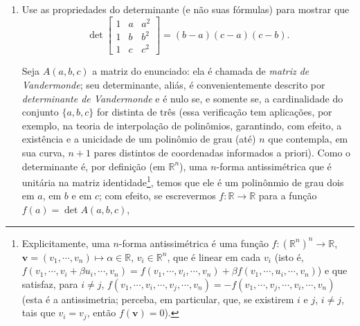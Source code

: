 \documentclass[leqno]{article}
\begin{document}
\begin{enumerate}
\begin{sol}
\end{sol}


\item Use as propriedades do determinante (e não suas fórmulas) para mostrar que
$$\det \begin{bmatrix} 1 & a & a^2 \\ 1 & b & b^2 \\ 1 & c & c^2 \end{bmatrix} = (b-a)(c-a)(c-b).$$

\begin{sol}	
	Seja $A(a, b, c)$ a matriz do enunciado: ela é chamada de \textit{matriz de Vandermonde}; seu determinante, aliás, é convenientemente descrito por \textit{determinante de Vandermonde} e é nulo se, e somente se, a cardinalidade do conjunto $\{a, b, c\}$ for distinta de três (essa verificação tem aplicações, por exemplo, na teoria de interpolação de polinômios, garantindo, com efeito, a existência e a unicidade de um polinômio de grau (até) $n$ que contempla, em sua curva, $n + 1$ pares distintos de coordenadas informados a priori). Como o determinante é, por definição (em $\mathbb{R}^{n}$), uma $n$-forma antissimétrica que é unitária na matriz identidade\footnote{Explicitamente, uma $n$-forma antissimétrica é uma função $f: (\mathbb{R}^{n})^{n} \rightarrow \mathbb{R}$, $\mathbf{v} = (v_{1}, \cdots, v_{n}) \mapsto \alpha \in \mathbb{R}$, $v_{i} \in \mathbb{R}^{n}$, que é linear em cada $v_{i}$ (isto é, $f(v_{1}, \cdots, v_{i} + \beta u_{i}, \cdots, v_{n}) = f(v_{1}, \cdots, v_{i}, \cdots, v_{n}) + \beta f(v_{1}, \cdots, u_{i}, \cdots, v_{n})$) e que satisfaz, para $i \neq j$, $f(v_{1}, \cdots, v_{i}, \cdots, v_{j}, \cdots, v_{n}) = -f(v_{1}, \cdots, v_{j}, \cdots, v_{i}, \cdots, v_{n})$ (esta é a antissimetria; perceba, em particular, que, se existirem $i$ e $j$, $i \neq j$, tais que $v_{i} = v_{j}$, então $f(\mathbf{v}) = 0$).}, temos que ele é um polinônmio de grau dois em $a$, em $b$ e em $c$; com efeito, se escrevermos $f : \mathbb{R} \rightarrow \mathbb{R}$ para a função $f(a) = \det A(a, b, c)$, 


\end{sol}
\end{enumerate}
\end{document}
